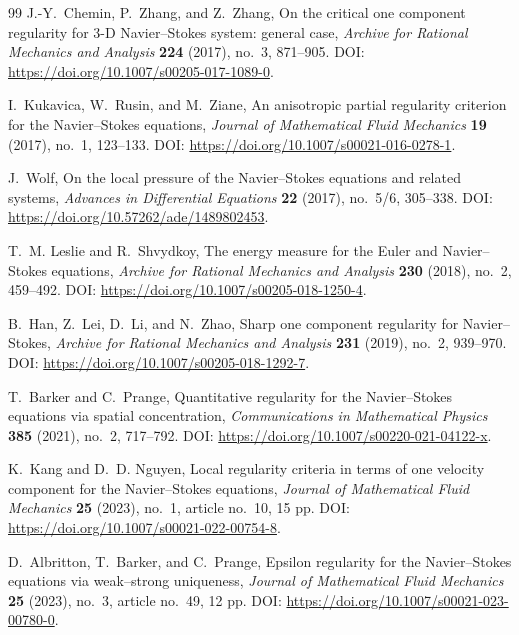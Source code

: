 \documentclass[11pt]{article}
\numberwithin{equation}{section}
\begin{document}
\begin{thebibliography}{99}
J.-Y.~Chemin, P.~Zhang, and Z.~Zhang,
\newblock On the critical one component regularity for 3-D Navier--Stokes system: general case,
\newblock \emph{Archive for Rational Mechanics and Analysis} \textbf{224} (2017), no.~3, 871--905.
\newblock DOI: \url{https://doi.org/10.1007/s00205-017-1089-0}.

I.~Kukavica, W.~Rusin, and M.~Ziane,
\newblock An anisotropic partial regularity criterion for the Navier--Stokes equations,
\newblock \emph{Journal of Mathematical Fluid Mechanics} \textbf{19} (2017), no.~1, 123--133.
\newblock DOI: \url{https://doi.org/10.1007/s00021-016-0278-1}.

J.~Wolf,
\newblock On the local pressure of the Navier--Stokes equations and related systems,
\newblock \emph{Advances in Differential Equations} \textbf{22} (2017), no.~5/6, 305--338.
\newblock DOI: \url{https://doi.org/10.57262/ade/1489802453}.

T.~M. Leslie and R.~Shvydkoy,
\newblock The energy measure for the Euler and Navier--Stokes equations,
\newblock \emph{Archive for Rational Mechanics and Analysis} \textbf{230} (2018), no.~2, 459--492.
\newblock DOI: \url{https://doi.org/10.1007/s00205-018-1250-4}.

B.~Han, Z.~Lei, D.~Li, and N.~Zhao,
\newblock Sharp one component regularity for Navier--Stokes,
\newblock \emph{Archive for Rational Mechanics and Analysis} \textbf{231} (2019), no.~2, 939--970.
\newblock DOI: \url{https://doi.org/10.1007/s00205-018-1292-7}.

T.~Barker and C.~Prange,
\newblock Quantitative regularity for the Navier--Stokes equations via spatial concentration,
\newblock \emph{Communications in Mathematical Physics} \textbf{385} (2021), no.~2, 717--792.
\newblock DOI: \url{https://doi.org/10.1007/s00220-021-04122-x}.

K.~Kang and D.~D. Nguyen,
\newblock Local regularity criteria in terms of one velocity component for the Navier--Stokes equations,
\newblock \emph{Journal of Mathematical Fluid Mechanics} \textbf{25} (2023), no.~1, article no.~10, 15 pp.
\newblock DOI: \url{https://doi.org/10.1007/s00021-022-00754-8}.

D.~Albritton, T.~Barker, and C.~Prange,
\newblock Epsilon regularity for the Navier--Stokes equations via weak--strong uniqueness,
\newblock \emph{Journal of Mathematical Fluid Mechanics} \textbf{25} (2023), no.~3, article no.~49, 12 pp.
\newblock DOI: \url{https://doi.org/10.1007/s00021-023-00780-0}.


\end{thebibliography}
\end{document}

